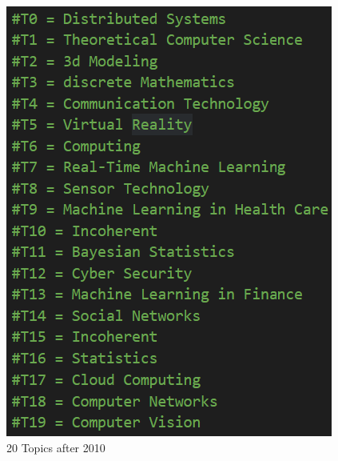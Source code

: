 \documentclass[fleqn,10pt]{SelfArx} %
\begin{document}
\begin{figure}[ht]\centering
	\includegraphics[width=\linewidth]{Figures/After 2010 Topics.png}
	\caption{20 Topics after 2010}
	\label{fig:aptoday}
\end{figure}






\end{document}
